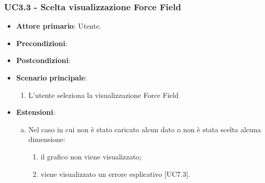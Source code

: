\subsubsection{UC3.3 - Scelta visualizzazione Force Field}
\begin{figure}[h]
\centering
\caption{}
\end{figure}
\begin{itemize}
	\item \textbf{Attore primario}: Utente.
	\item \textbf{Precondizioni}:
	\item \textbf{Postcondizioni}:
	\item \textbf{Scenario principale}:
		\begin{enumerate}
			\item L'utente seleziona la visualizzazione Force Field
		\end{enumerate}
	\item \textbf{Estensioni}:
	\begin{enumerate}[(a)]
		\item Nel caso in cui non è stato caricato alcun dato o non è stata scelta alcuna dimensione:
		\begin{enumerate}[1.]
			\item il grafico non viene visualizzato;
			\item viene visualizzato un errore esplicativo [UC7.3].
		\end{enumerate}
	\end{enumerate}
\end{itemize}